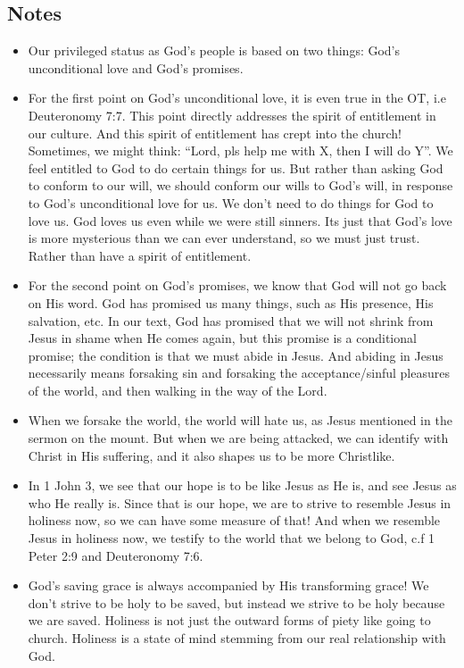 \subsection*{Notes}
\begin{itemize}
  \item{Our privileged status as God’s people is based on two things: God’s unconditional love and God’s promises.}
  \item{ For the first point on God’s unconditional love, it is even true in
  the OT, i.e Deuteronomy 7:7. This point directly addresses the spirit of
  entitlement in our culture. And this spirit of entitlement has crept into
  the church! Sometimes, we might think: “Lord, pls help me with X, then I
  will do Y”. We feel entitled to God to do certain things for us. But rather
  than asking God to conform to our will, we should conform our wills to
  God’s will, in response to God’s unconditional love for us. We don’t need
  to do things for God to love us. God loves us even while we were still
  sinners. Its just that God’s love is more mysterious than we can ever
  understand, so we must just trust. Rather than have a spirit of
  entitlement. }
  \item{For the second point on God’s promises, we know that God will not go
  back on His word. God has promised us many things, such as His presence,
  His salvation, etc. In our text, God has promised that we will not shrink
  from Jesus in shame when He comes again, but this promise is a conditional
  promise; the condition is that we must abide in Jesus. And abiding in Jesus
  necessarily means forsaking sin and forsaking the acceptance/sinful
  pleasures of the world, and then walking in the way of the Lord. }
  \item{ When we forsake the world, the world will hate us, as Jesus
  mentioned in the sermon on the mount. But when we are being attacked, we
  can identify with Christ in His suffering, and it also shapes us to be more
  Christlike.}
  \item{In 1 John 3, we see that our hope is to be like Jesus as He is,
  and see Jesus as who He really is. Since that is our hope, we are to strive
  to resemble Jesus in holiness now, so we can have some measure of that! And
  when we resemble Jesus in holiness now, we testify to the world that we
  belong to God, c.f 1 Peter 2:9 and Deuteronomy 7:6. }
  \item{God’s saving grace is always accompanied by His transforming grace! We don’t strive to be holy to be saved, but instead we strive to be holy because we are saved. Holiness is not just the outward forms of piety like going to church. Holiness is a state of mind stemming from our real relationship with God.}

\end{itemize}
